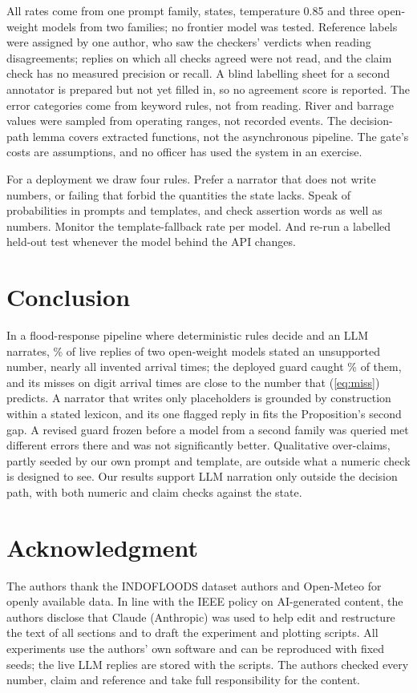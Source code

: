 \documentclass[conference]{IEEEtran}
\begin{document}
All rates come from one prompt family, \LiveStates{} states, temperature 0.85 and three open-weight models from two families; no frontier model was tested. Reference labels were assigned by one author, who saw the checkers' verdicts when reading disagreements; replies on which all checks agreed were not read, and the claim check has no measured precision or recall. A blind labelling sheet for a second annotator is prepared but not yet filled in, so no agreement score is reported. The error categories come from keyword rules, not from reading. River and barrage values were sampled from operating ranges, not recorded events. The decision-path lemma covers extracted functions, not the asynchronous pipeline. The gate's costs are assumptions, and no officer has used the system in an exercise.

For a deployment we draw four rules. Prefer a narrator that does not write numbers, or failing that forbid the quantities the state lacks. Speak of probabilities in prompts and templates, and check assertion words as well as numbers. Monitor the template-fallback rate per model. And re-run a labelled held-out test whenever the model behind the API changes.

\section{Conclusion}
In a flood-response pipeline where deterministic rules decide and an LLM narrates, \LiveUnsupPct\% of live replies of two open-weight models stated an unsupported number, nearly all invented arrival times; the deployed guard caught \LiveDepRec\% of them, and its misses on digit arrival times are close to the number that (\ref{eq:miss}) predicts. A narrator that writes only placeholders is grounded by construction within a stated lexicon, and its one flagged reply in \SlotsPassed{} fits the Proposition's second gap. A revised guard frozen before a model from a second family was queried met different errors there and was not significantly better. Qualitative over-claims, partly seeded by our own prompt and template, are outside what a numeric check is designed to see. Our results support LLM narration only outside the decision path, with both numeric and claim checks against the state.

\section*{Acknowledgment}
The authors thank the INDOFLOODS dataset authors and Open-Meteo for openly available data.
In line with the IEEE policy on AI-generated content, the authors disclose that Claude (Anthropic) was used to help edit and restructure the text of all sections and to draft the experiment and plotting scripts. All experiments use the authors' own software and can be reproduced with fixed seeds; the live LLM replies are stored with the scripts. The authors checked every number, claim and reference and take full responsibility for the content.
\end{document}
